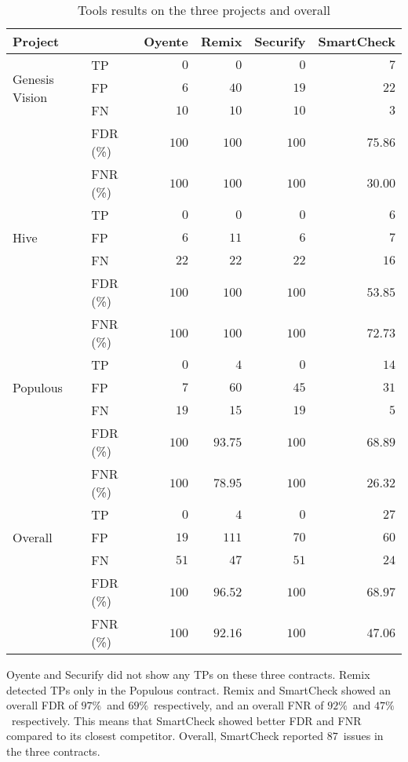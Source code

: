 \begin{table*}[t]
	\centering
	\caption{Tools results on the three projects and overall}
	\begin{tabular}{|l|l|r|r|r|r|}
		\hline
		\textbf{Project} &  & \textbf{Oyente} & \textbf{Remix} & \textbf{Securify} & \textbf{SmartCheck} \\
		\hline
		\multirow{3}{*}{Genesis Vision}
			& TP & $0$ & $0$ & $0$ & $7$ \\
			& FP & $6$ & $40$ & $19$ & $22$ \\
			& FN & $10$ & $10$ & $10$ & $3$ \\
			& FDR (\%) & $100$ & $100$ & $100$ & $75.86$ \\
			& FNR (\%) & $100$ & $100$ & $100$ & $30.00$ \\
		\hline
		\multirow{3}{*}{Hive}
			& TP & $0$ & $0$ & $0$ & $6$ \\
			& FP & $6$ & $11$ & $6$ & $7$ \\
			& FN & $22$ & $22$ & $22$ & $16$ \\
			& FDR (\%) & $100$ & $100$ & $100$ & $53.85$ \\
			& FNR (\%) & $100$ & $100$ & $100$ & $72.73$ \\
		\hline
		\multirow{3}{*}{Populous}
			& TP & $0$ & $4$ & $0$ & $14$ \\
			& FP & $7$ & $60$ & $45$ & $31$ \\
			& FN & $19$ & $15$ & $19$ & $5$ \\
			& FDR (\%) & $100$ & $93.75$ & $100$ & $68.89$ \\
			& FNR (\%) & $100$ & $78.95$ & $100$ & $26.32$ \\
		\hline
		\multirow{3}{*}{Overall}
			& TP & $0$ & $4$ & $0$ & $27$ \\
			& FP & $19$ & $111$ & $70$ & $60$ \\
			& FN & $51$ & $47$ & $51$ & $24$ \\
			& FDR (\%) & $100$ & $96.52$ & $100$ & $68.97$ \\
			& FNR (\%) & $100$ & $92.16$ & $100$ & $47.06$ \\
		\hline
	\end{tabular}
	\label{CaseStudyTable}
\end{table*}

Oyente and Securify did not show any TPs on these three contracts.
Remix detected TPs only in the Populous contract.
Remix and SmartCheck showed an overall FDR of $97\%$~and $69\%$~respectively, and an overall FNR of $92\%$~and $47\%$~respectively.
This means that SmartCheck showed better FDR and FNR compared to its closest competitor.
Overall, SmartCheck reported $87$~issues in the three contracts.

